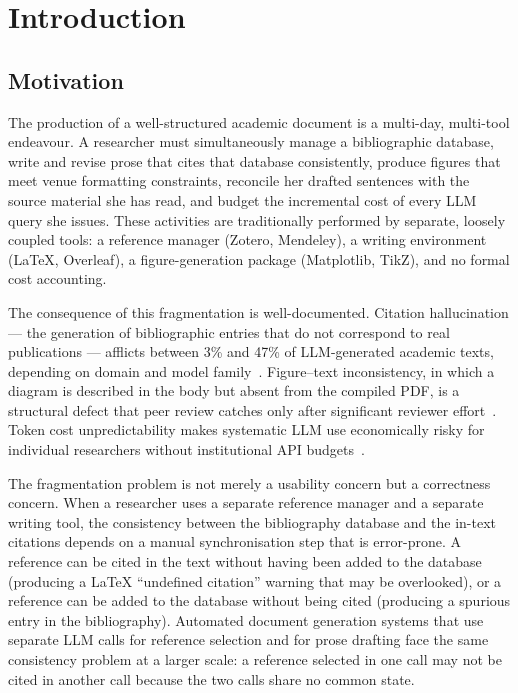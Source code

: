 \section{Introduction}
\label{sec:introduction}

\subsection{Motivation}

The production of a well-structured academic document is a multi-day, multi-tool endeavour.
A researcher must simultaneously manage a bibliographic database, write and revise prose that
cites that database consistently, produce figures that meet venue formatting constraints,
reconcile her drafted sentences with the source material she has read, and budget the
incremental cost of every LLM query she issues.
These activities are traditionally performed by separate, loosely coupled tools:
a reference manager (Zotero, Mendeley), a writing environment (\LaTeX{}, Overleaf),
a figure-generation package (Matplotlib, TikZ), and no formal cost accounting.

The consequence of this fragmentation is well-documented.
Citation hallucination — the generation of bibliographic entries that do not correspond to
real publications — afflicts between 3\% and 47\% of LLM-generated academic texts,
depending on domain and model family~\cite{alkaissi2023hallucinated}.
Figure--text inconsistency, in which a diagram is described in the body but absent from the
compiled PDF, is a structural defect that peer review catches only after significant
reviewer effort~\cite{stelmakh2021novice}.
Token cost unpredictability makes systematic LLM use economically risky for individual
researchers without institutional API budgets~\cite{chen2023frugalgpt}.

The fragmentation problem is not merely a usability concern but a correctness concern.
When a researcher uses a separate reference manager and a separate writing tool, the
consistency between the bibliography database and the in-text citations depends on a
manual synchronisation step that is error-prone.
A reference can be cited in the text without having been added to the database
(producing a LaTeX ``undefined citation'' warning that may be overlooked), or
a reference can be added to the database without being cited (producing a spurious
entry in the bibliography).
Automated document generation systems that use separate LLM calls for reference
selection and for prose drafting face the same consistency problem at a larger scale:
a reference selected in one call may not be cited in another call because the two calls
share no common state.

